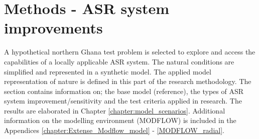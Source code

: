 
\section{Methods - ASR system improvements}
\label{section:test_problem_def}
A hypothetical northern Ghana test problem is selected to explore and access the capabilities of a locally applicable ASR system. The natural conditions are simplified and represented in a synthetic model. The applied model representation of nature is defined in this part of the research methodology. The section contains information on; the base model (reference), the types of ASR system improvement/sensitivity and the test criteria applied in research. The results are elaborated in Chapter \ref{chapter:model_scenarios}. Additional information on the modelling environment (MODFLOW) is included in the Appendices \ref{chapter:Extense_Modflow_model} - \ref{MODFLOW_radial}. 

%
%

